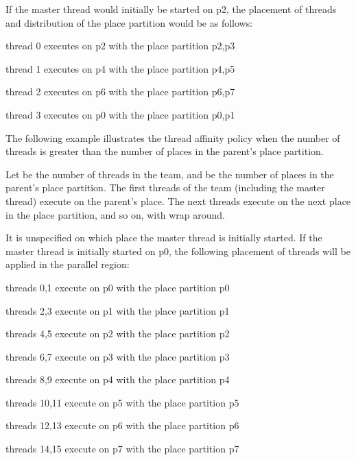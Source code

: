 If the master thread would initially be started on p2, the placement of threads 
and distribution of the place partition would be as follows:

\begin{compactitem}
\item thread 0 executes on p2 with the place partition p2,p3

\item thread 1 executes on p4 with the place partition p4,p5

\item thread 2 executes on p6 with the place partition p6,p7

\item thread 3 executes on p0 with the place partition p0,p1
\end{compactitem}

The following example illustrates the  thread affinity policy when 
the number of threads is greater than the number of places in the parent's place 
partition.

Let  be the number of threads in the team, and  be the number of places in the 
parent's place partition. The first  threads of the team (including the master 
thread) execute on the parent's place. The next  threads execute on the next 
place in the place partition, and so on, with wrap around. 



It is unspecified on which place the master thread is initially started. If the 
master thread is initially started on p0, the following placement of threads will 
be applied in the parallel region:

\begin{compactitem}
\item threads 0,1 execute on p0 with the place partition p0

\item threads 2,3 execute on p1 with the place partition p1

\item threads 4,5 execute on p2 with the place partition p2

\item threads 6,7 execute on p3 with the place partition p3

\item threads 8,9 execute on p4 with the place partition p4

\item threads 10,11 execute on p5 with the place partition p5

\item threads 12,13 execute on p6 with the place partition p6

\item threads 14,15 execute on p7 with the place partition p7
\end{compactitem}

